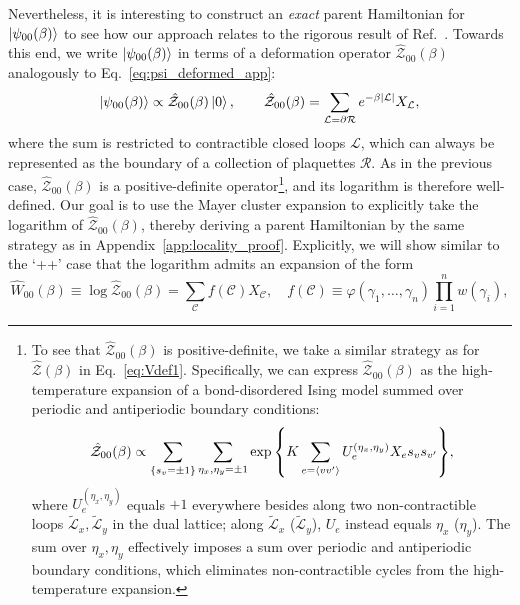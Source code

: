 Nevertheless, it is interesting to construct an \emph{exact} parent Hamiltonian for $\ket{\psi_{00}(\beta)}$ to see how our approach relates to the rigorous result of Ref.~. Towards this end, we write $\ket{\psi_{00}(\beta)}$ in terms of a deformation operator $\hat{\mathcal{Z}}_{00}(\beta)$ analogously to Eq.~\eqref{eq:psi_deformed_app}: 
\begin{equation} \label{eqn:def00}
    \ket{\psi_{00}(\beta)} \propto \hat{\mathcal{Z}}_{00}(\beta) \ket{0}, \qquad \hat{\mathcal{Z}}_{00}(\beta) = \sum_{\mathcal{L} = \partial \mathcal{R}} e^{-\beta\abs{\mathcal{L}}} X_{\mathcal{L}},
\end{equation}
where the sum is restricted to contractible closed loops $\mathcal{L}$, which can always be represented as the boundary of a collection of plaquettes $\mathcal{R}$. As in the previous case, $\hat{\mathcal{Z}}_{00}(\beta)$ is a positive-definite operator\footnote{To see that $\hat{\mathcal{Z}}_{00}(\beta)$ is positive-definite, we take a similar strategy as for $\hat{\mathcal{Z}}(\beta)$ in Eq.~\eqref{eq:Vdef1}. Specifically, we can express $\hat{\mathcal{Z}}_{00}(\beta)$ as the high-temperature expansion of a bond-disordered Ising model summed over periodic and antiperiodic boundary conditions:
\begin{equation}
    \hat{\mathcal{Z}}_{00}(\beta) \propto \sum_{\qty{s_v = \pm 1}} \sum_{\eta_x, \eta_y = \pm 1} \exp \qty{ K \sum_{e = \expval{v v'}} U_e^{(\eta_x, \eta_y)} X_{e} s_v s_{v'} } ,
\end{equation}
where $U_e^{(\eta_x, \eta_y)}$ equals $+1$ everywhere besides along two non-contractible loops $\tilde{\mathcal{L}}_x, \tilde{\mathcal{L}}_y$ in the dual lattice; along $\tilde{\mathcal{L}}_x$ ($\tilde{\mathcal{L}}_y$), $U_e$ instead equals $\eta_x$ ($\eta_y$). The sum over $\eta_x, \eta_y$ effectively imposes a sum over periodic and antiperiodic boundary conditions, which eliminates non-contractible cycles from the high-temperature expansion.}, and its logarithm is therefore well-defined. Our goal is to use the Mayer cluster expansion to explicitly take the logarithm of $\hat{\mathcal{Z}}_{00}(\beta)$, thereby deriving a parent Hamiltonian by the same strategy as in Appendix~\ref{app:locality_proof}. Explicitly, we will show similar to the `++' case that the logarithm admits an expansion of the form
\begin{equation}
    \hat{W}_{00}(\beta) \equiv \log \hat{\mathcal{Z}}_{00}(\beta) = \sum_{\mathcal{C}} f(\mathcal{C}) X_{\mathcal{C}}, \quad f(\mathcal{C}) \equiv \varphi(\gamma_1 , \ldots , \gamma_n) \prod_{i = 1}^n w(\gamma_i) ,
\end{equation}
